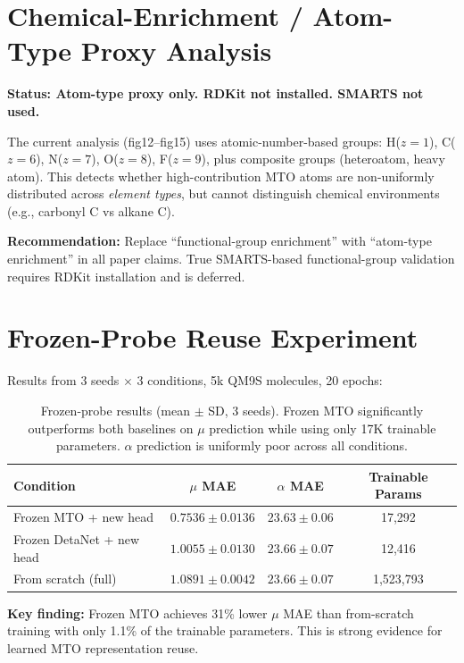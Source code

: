 \documentclass[11pt,a4paper]{article}
\begin{document}
\section{Chemical-Enrichment / Atom-Type Proxy Analysis}

\textbf{Status: Atom-type proxy only. RDKit not installed. SMARTS not used.}

The current analysis (fig12--fig15) uses atomic-number-based groups: H($z{=}1$), C($z{=}6$), N($z{=}7$), O($z{=}8$), F($z{=}9$), plus composite groups (heteroatom, heavy atom). This detects whether high-contribution MTO atoms are non-uniformly distributed across \textit{element types}, but cannot distinguish chemical environments (e.g., carbonyl C vs alkane C).

\textbf{Recommendation:} Replace ``functional-group enrichment'' with ``atom-type enrichment'' in all paper claims. True SMARTS-based functional-group validation requires RDKit installation and is deferred.

\section{Frozen-Probe Reuse Experiment}

Results from 3 seeds $\times$ 3 conditions, 5k QM9S molecules, 20 epochs:

\begin{table}[ht]
\centering
\begin{tabular}{lccc}
\toprule
\textbf{Condition} & \textbf{$\mu$ MAE} & \textbf{$\alpha$ MAE} & \textbf{Trainable Params} \\
\midrule
Frozen MTO + new head & $0.7536 \pm 0.0136$ & $23.63 \pm 0.06$ & 17,292 \\
Frozen DetaNet + new head & $1.0055 \pm 0.0130$ & $23.66 \pm 0.07$ & 12,416 \\
From scratch (full) & $1.0891 \pm 0.0042$ & $23.66 \pm 0.07$ & 1,523,793 \\
\bottomrule
\end{tabular}
\caption{Frozen-probe results (mean $\pm$ SD, 3 seeds). Frozen MTO significantly outperforms both baselines on $\mu$ prediction while using only 17K trainable parameters. $\alpha$ prediction is uniformly poor across all conditions.}
\end{table}

\textbf{Key finding:} Frozen MTO achieves 31\% lower $\mu$ MAE than from-scratch training with only 1.1\% of the trainable parameters. This is strong evidence for learned MTO representation reuse.
\end{document}
